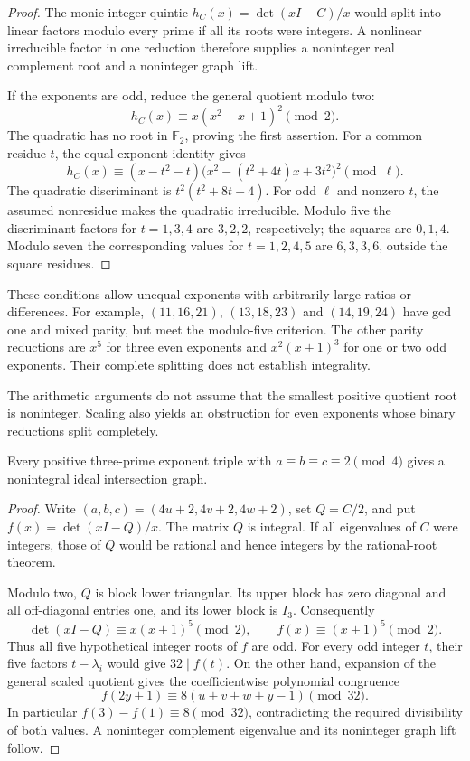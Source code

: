 \begin{proof}
The monic integer quintic $h_C(x)=\det(xI-C)/x$ would split into
linear factors modulo every prime if all its roots were integers.
A nonlinear irreducible factor in one reduction therefore supplies a
noninteger real complement root and a noninteger graph lift.

If the exponents are odd, reduce the general quotient modulo two:
\[
h_C(x)\equiv x(x^2+x+1)^2\pmod2.
\]
The quadratic has no root in $\mathbb F_2$, proving the first assertion.
For a common residue $t$, the equal-exponent identity gives
\[
h_C(x)\equiv(x-t^2-t)
\bigl(x^2-(t^2+4t)x+3t^2\bigr)^2\pmod\ell.
\]
The quadratic discriminant is $t^2(t^2+8t+4)$. For odd $\ell$ and
nonzero $t$, the assumed nonresidue makes the quadratic irreducible.
Modulo five the discriminant factors for $t=1,3,4$ are $3,2,2$,
respectively; the squares are $0,1,4$. Modulo seven the corresponding
values for $t=1,2,4,5$ are $6,3,3,6$, outside the square residues.
\end{proof}

These conditions allow unequal exponents with arbitrarily large ratios
or differences. For example, $(11,16,21)$, $(13,18,23)$ and $(14,19,24)$
have gcd one and mixed parity, but meet the modulo-five criterion.
The other parity reductions are $x^5$ for three even exponents and
$x^2(x+1)^3$ for one or two odd exponents. Their complete splitting
does not establish integrality.

The arithmetic arguments do not assume that the smallest positive
quotient root is noninteger. Scaling also yields an obstruction for even
exponents whose binary reductions split completely.

\begin{theorem}
\label{thm:even-congruence}
Every positive three-prime exponent triple with
$a\equiv b\equiv c\equiv2\pmod4$ gives a nonintegral ideal intersection
graph.
\end{theorem}

\begin{proof}
Write $(a,b,c)=(4u+2,4v+2,4w+2)$, set $Q=C/2$, and put
$f(x)=\det(xI-Q)/x$. The matrix $Q$ is integral. If all eigenvalues
of $C$ were integers, those of $Q$ would be rational and hence integers
by the rational-root theorem.

Modulo two, $Q$ is block lower triangular. Its upper block has zero
diagonal and all off-diagonal entries one, and its lower block is $I_3$.
Consequently
\[
\det(xI-Q)\equiv x(x+1)^5\pmod2,
\qquad f(x)\equiv(x+1)^5\pmod2.
\]
Thus all five hypothetical integer roots of $f$ are odd. For every odd
integer $t$, their five factors $t-\lambda_i$ would give $32\mid f(t)$.
On the other hand, expansion of the general scaled quotient gives the
coefficientwise polynomial congruence
\[
f(2y+1)\equiv8(u+v+w+y-1)\pmod{32}.
\]
In particular $f(3)-f(1)\equiv8\pmod{32}$, contradicting the required
divisibility of both values. A noninteger complement eigenvalue and its
noninteger graph lift follow.
\end{proof}

